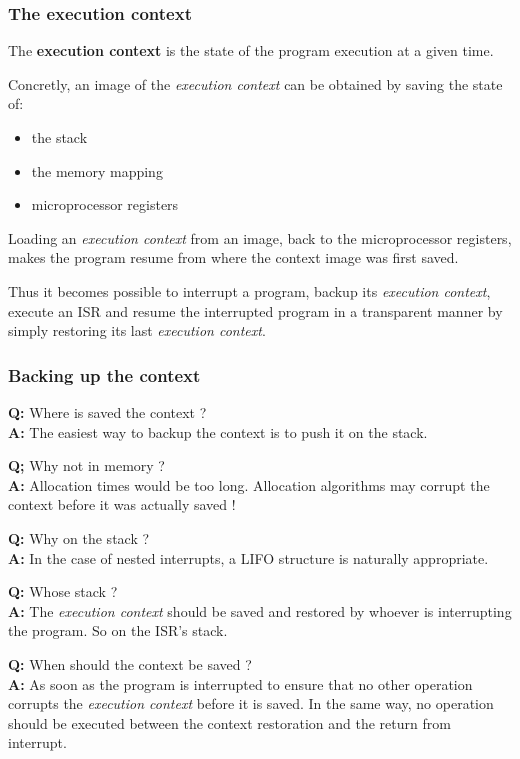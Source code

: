 \begin{frame}
  \frametitle{The execution context}

  The {\bf execution context} is the state of the program execution at a given
  time.

  \nl

  Concretly, an image of the {\em execution context} can be obtained by saving
  the state of:

  \begin{itemize}
    \item the stack
    \item the memory mapping
    \item microprocessor registers
  \end{itemize}

  \nl

  Loading an {\em execution context} from an image, back to the microprocessor
  registers, makes the program resume from where the context image was first
  saved.

  \nl

  Thus it becomes possible to interrupt a program, backup its {\em execution
  context}, execute an ISR and resume the interrupted program in a transparent
  manner by simply restoring its last {\em execution context}.

\end{frame}

%
%
%

\begin{frame}
  \frametitle{Backing up the context}

  {\bf Q:} Where is saved the context ?\\
  {\bf A:} The easiest way to backup the context is to push it on the stack.

  \nl

  {\bf Q;} Why not in memory ?\\
  {\bf A:} Allocation times would be too long. Allocation algorithms may
  corrupt the context before it was actually saved !

  \nl

  {\bf Q:} Why on the stack ?\\
  {\bf A:} In the case of nested interrupts, a LIFO structure is naturally
  appropriate.

  \nl

  {\bf Q:} Whose stack ?\\
  {\bf A:} The {\em execution context} should be saved and restored by whoever is
  interrupting the program. So on the ISR's stack.

  \nl

  {\bf Q:} When should the context be saved ?\\
  {\bf A:} As soon as the program is interrupted to ensure that no other
  operation corrupts the {\em execution context} before it is saved. In the same
  way, no operation should be executed between the context restoration and the
  return from interrupt.

\end{frame}

